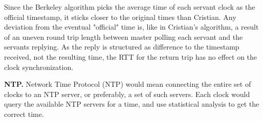 \documentclass[12pt,a4paper,titlepage]{article}
\begin{document}
Since the Berkeley algorithm picks the average time of each servant clock as the official timestamp, it sticks closer to the original times than Cristian. Any deviation from the eventual "official" time is, like in Cristian's algorithm, a result of an uneven round trip length between master polling each servant and the servants replying. As the reply is structured as difference to the timestamp received, not the resulting time, the RTT for the return trip has no effect on the clock synchronization.

\textbf{NTP.} Network Time Protocol (NTP) would mean connecting the entire set of clocks to an NTP server, or preferably, a set of such servers. Each clock would query the available NTP servers for a time, and use statistical analysis to get the correct time.
\end{document}
